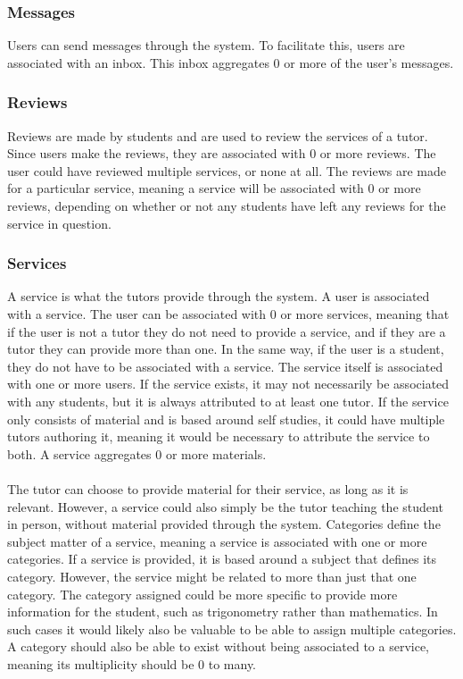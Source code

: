 \subsubsection{Messages}
Users can send messages through the system.
To facilitate this, users are associated with an inbox.
This inbox aggregates 0 or more of the user's messages.

\subsubsection{Reviews}
Reviews are made by students and are used to review the services of a tutor.
Since users make the reviews, they are associated with 0 or more reviews.
The user could have reviewed multiple services, or none at all.
The reviews are made for a particular service, meaning a service will be associated with 0 or more reviews, depending on whether or not any students have left any reviews for the service in question.

\subsubsection{Services}
A service is what the tutors provide through the system.
A user is associated with a service.
The user can be associated with 0 or more services, meaning that if the user is not a tutor they do not need to provide a service, and if they are a tutor they can provide more than one. 
In the same way, if the user is a student, they do not have to be associated with a service.
The service itself is associated with one or more users.
If the service exists, it may not necessarily be associated with any students, but it is always attributed to at least one tutor.
If the service only consists of material and is based around self studies, it could have multiple tutors authoring it, meaning it would be necessary to attribute the service to both.
A service aggregates 0 or more materials.
\\\\
The tutor can choose to provide material for their service, as long as it is relevant.
However, a service could also simply be the tutor teaching the student in person, without material provided through the system.
Categories define the subject matter of a service, meaning a service is associated with one or more categories.
If a service is provided, it is based around a subject that defines its category.
However, the service might be related to more than just that one category.
The category assigned could be more specific to provide more information for the student, such as trigonometry rather than mathematics.
In such cases it would likely also be valuable to be able to assign multiple categories.
A category should also be able to exist without being associated to a service, meaning its multiplicity should be 0 to many.